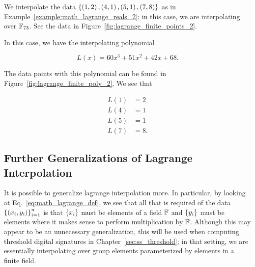 \begin{example}
\label{example:math_lagrange_finite_2}

We interpolate the data
$\left\{ \left( 1,2 \right),\left( 4,1 \right),\left( 5,1 \right),\left( 7,8 \right) \right\}$ as
in Example~\ref{example:math_lagrange_reals_2};
in this case, we are interpolating over $\mathbb{F}_{73}$.
See the data in Figure~\ref{fig:lagrange_finite_points_2}.



In this case, we have the interpolating polynomial

\begin{equation}
    L(x) = 60x^{3} + 51x^{2} + 42x + 68.
\end{equation}

\noindent
The data points with this polynomial can be found in
Figure~\ref{fig:lagrange_finite_poly_2}.
We see that

\begin{align}
    L(1) &= 2 \nonumber\\
    L(4) &= 1 \nonumber\\
    L(5) &= 1 \nonumber\\
    L(7) &= 8.
\end{align}
\end{example}

\subsection{Further Generalizations of Lagrange Interpolation}

It is possible to generalize \gls{lagrange interpolation} more.
In particular, by looking at Eq.~\eqref{eq:math_lagrange_def},
we see that all that is required of the data
$\left\{ \left( x_{i},y_{i} \right) \right\}_{i=1}^{n}$
is that $\left\{ x_{i} \right\}$ must be elements of a \gls{field} $\mathbb{F}$
and $\left\{ y_{i} \right\}$ must be elements where it makes sense to perform
multiplication by $\mathbb{F}$.
Although this may appear to be an unnecessary generalization,
this will be used when computing threshold digital signatures
in Chapter~\ref{sec:ss_threshold};
in that setting, we are essentially interpolating over \gls{group} elements
parameterized by elements in a \gls{finite field}.
